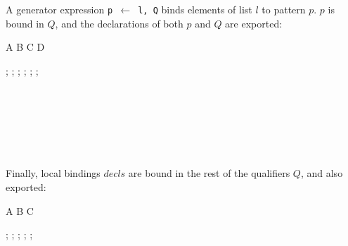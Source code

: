 A generator expression \texttt{p $\leftarrow$ l, Q} binds elements of
list $l$ to pattern $p$. $p$ is bound in $Q$, and the declarations of
both $p$ and $Q$ are exported:

\begin{scopeDescription}
\begin{center}
\begin{tikzScopeDiagram}
  \tikzRoot
    {A}{
      {B}{}
      {C}{}
      {D}{}}

  \begin{tikzEdges}
    ;
    ;
    ;
    ;
    ;
    ;
  \end{tikzEdges}
\end{tikzScopeDiagram}
\end{center}
\begin{ScopeRules}
   \\
   \\
   \\
   \\
   \\
\end{ScopeRules}
\end{scopeDescription}

Finally, local bindings $decls$ are bound in the rest of the
qualifiers $Q$, and also exported:

\begin{scopeDescription}
\begin{center}
\begin{tikzScopeDiagram}
  \tikzRoot
    {A}{
      {B}{}
      {C}{}}

  \begin{tikzEdges}
    ;
    ;
    ;
    ;
    ;
  \end{tikzEdges}
\end{tikzScopeDiagram}
\end{center}
\begin{ScopeRules}
   \\
   \\
   \\
   \\
\end{ScopeRules}
\end{scopeDescription}


